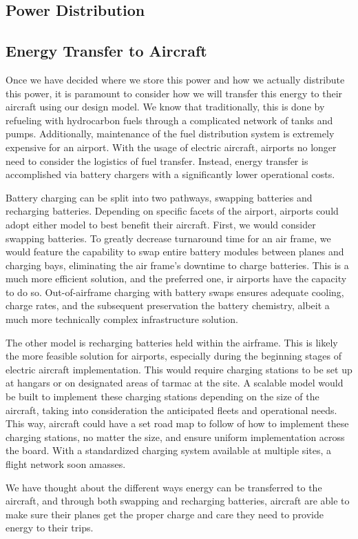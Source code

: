 \documentclass[../main.tex]{subfiles}
\begin{document}
\subsection{Power Distribution} %

\subsection{Energy Transfer to Aircraft} %
Once we have decided where we store this power and how we actually distribute this power, it is paramount to consider how we will transfer this energy to their aircraft using our design model. We know that traditionally, this is done by refueling with hydrocarbon fuels through a complicated network of tanks and pumps. Additionally, maintenance of the fuel distribution system is extremely expensive for an airport. With the usage of electric aircraft, airports no longer need to consider the logistics of fuel transfer. Instead, energy transfer is accomplished via battery chargers with a significantly lower operational costs.\par
Battery charging can be split into two pathways, swapping batteries and recharging batteries. Depending on specific facets of the airport, airports could adopt either model to best benefit their aircraft. First, we would consider swapping batteries. To greatly decrease turnaround time for an air frame, we would feature the capability to swap entire battery modules between planes and charging bays, eliminating the air frame’s downtime to charge batteries. This is a much more efficient solution, and the preferred one, ir airports have the capacity to do so. Out-of-airframe charging with battery swaps ensures adequate cooling, charge rates, and the subsequent preservation the battery chemistry, albeit a much more technically complex infrastructure solution.\par
The other model is recharging batteries held within the airframe. This is likely the more feasible solution for airports, especially during the beginning stages of electric aircraft implementation. This would require charging stations to be set up at hangars or on designated areas of tarmac at the site. A scalable model would be built to implement these charging stations depending on the size of the aircraft, taking into consideration the anticipated fleets and operational needs. This way, aircraft could have a set road map to follow of how to implement these charging stations, no matter the size, and ensure uniform implementation across the board. With a standardized charging system available at multiple sites, a flight network soon amasses.\par
We have thought about the different ways energy can be transferred to the aircraft, and through both swapping and recharging batteries, aircraft are able to make sure their planes get the proper charge and care they need to provide energy to their trips. 
\end{document}
